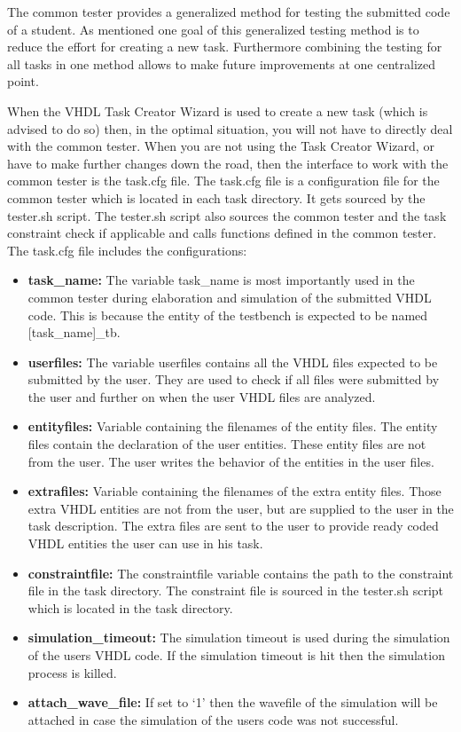 The common tester provides a generalized method for testing the submitted code of a student. As mentioned one goal of this generalized testing method is to reduce the effort for creating a new task. Furthermore combining the testing for all tasks in one method allows to make future improvements at one centralized point.

When the VHDL Task Creator Wizard is used to create a new task (which is advised to do so) then, in the optimal situation, you will not have to directly deal with the common tester. When you are not using the Task Creator Wizard, or have to make further changes down the road, then the interface to work with the common tester is the task.cfg file. The task.cfg file is a configuration file for the common tester which is located in each task directory. It gets sourced by the tester.sh script. The tester.sh script also sources the common tester and the task constraint check if applicable and calls functions defined in the common tester. The task.cfg file includes the configurations:
\begin{itemize}
\item {\bf task\_name:} The variable task\_name is most importantly used in the common tester during elaboration and simulation of the submitted VHDL code. This is because the entity of the testbench is expected to be named \mbox{[task\_name]\_tb}.
\item {\bf userfiles:} The variable userfiles contains all the VHDL files expected to be submitted by the user. They are used to check if all files were submitted by the user and further on when the user VHDL files are analyzed.
\item {\bf entityfiles:} Variable containing the filenames of the entity files. The entity files contain the declaration of the user entities. These entity files are not from the user. The user writes the behavior of the entities in the user files.
\item {\bf extrafiles:} Variable containing the filenames of the extra entity files. Those extra VHDL entities are not from the user, but are supplied to the user in the task description. The extra files are sent to the user to provide ready coded VHDL entities the user can use in his task.
\item {\bf constraintfile:} The constraintfile variable contains the path to the constraint file in the task directory. The constraint file is sourced in the tester.sh script which is located in the task directory.
\item {\bf simulation\_timeout:} The simulation timeout is used during the simulation of the users VHDL code. If the simulation timeout is hit then the simulation process is killed.
\item {\bf attach\_wave\_file:} If set to `1' then the wavefile of the simulation will be attached in case the simulation of the users code was not successful.
\end{itemize}



